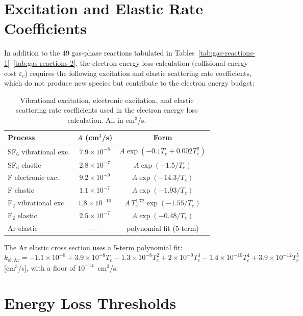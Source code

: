 \documentclass[11pt,a4paper]{report}
\begin{document}
\section{Excitation and Elastic Rate Coefficients}
\label{app:excitation}

In addition to the 49 gas-phase reactions tabulated in Tables~\ref{tab:gas-reactions-1}--\ref{tab:gas-reactions-2}, the electron energy loss calculation (collisional energy cost $\varepsilon_c$) requires the following excitation and elastic scattering rate coefficients, which do not produce new species but contribute to the electron energy budget:

\begin{table}[H]
\centering
\caption{Vibrational excitation, electronic excitation, and elastic scattering rate coefficients used in the electron energy loss calculation.  All in cm$^3$/s.}
\label{tab:app-excitation}
\begin{tabular}{@{}lcc@{}}
\toprule
\textbf{Process} & $A$ \textbf{(cm$^3$/s)} & \textbf{Form} \\
\midrule
SF$_6$ vibrational exc.  & $7.9\times10^{-8}$ & $A\exp(-0.1T_e + 0.002T_e^2)$ \\
SF$_6$ elastic           & $2.8\times10^{-7}$ & $A\exp(-1.5/T_e)$ \\
F electronic exc.        & $9.2\times10^{-9}$ & $A\exp(-14.3/T_e)$ \\
F elastic                & $1.1\times10^{-7}$ & $A\exp(-1.93/T_e)$ \\
F$_2$ vibrational exc.   & $1.8\times10^{-10}$ & $A\,T_e^{1.72}\exp(-1.55/T_e)$ \\
F$_2$ elastic            & $2.5\times10^{-7}$ & $A\exp(-0.48/T_e)$ \\
Ar elastic               & --- & polynomial fit (5-term) \\
\bottomrule
\end{tabular}
\end{table}

The Ar elastic cross section uses a 5-term polynomial fit: $k_\mathrm{el,Ar} = -1.1\times10^{-8} + 3.9\times10^{-8}T_e - 1.3\times10^{-8}T_e^2 + 2\times10^{-9}T_e^3 - 1.4\times10^{-10}T_e^4 + 3.9\times10^{-12}T_e^5$ [cm$^3$/s], with a floor of $10^{-14}$~cm$^3$/s.


\section{Energy Loss Thresholds}
\label{app:energy-thresholds}
\end{document}
